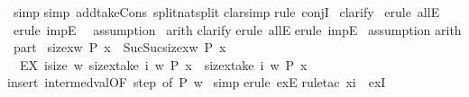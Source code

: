 \begin{isabellebody}
\ simp{\isacharparenright}\isanewline
{}simp\ add{\isacharcolon}take{\isacharunderscore}Cons\ split{\isacharcolon}nat{\isachardot}split{\isacharparenright}\isanewline
{}clarsimp{\isacharparenright}\isanewline
{}rule\ conjI{\isacharparenright}\isanewline
\ clarify{\isacharparenright}\isanewline
\ erule\ allE{\isacharparenright}\isanewline
\ erule\ impE{\isacharparenright}\isanewline
\ \ assumption{\isacharparenright}\isanewline
\ arith{\isacharparenright}\isanewline
{}clarify{\isacharparenright}\isanewline
{}erule\ allE{\isacharparenright}\isanewline
{}erule\ impE{\isacharparenright}\isanewline
\ assumption{\isacharparenright}\isanewline
{}arith{\isacharparenright}\isanewline
\isanewline
\isanewline
{}\ part{}{\isacharcolon}\isanewline
\ {\isachardoublequote}size{\isacharbrackleft}x{\isacharcolon}w{\isachardot}\ P\ x{\isacharbrackright}\ {\isacharequal}\ Suc{\isacharparenleft}Suc{\isacharparenleft}size{\isacharbrackleft}x{\isacharcolon}w{\isachardot}\ {\isachartilde}P\ x{\isacharbrackright}{\isacharparenright}{\isacharparenright}\ {\isacharequal}{\isacharequal}{\isachargreater}\isanewline
\ \ EX\ i{\isacharless}{\isacharequal}size\ w{\isachardot}\ size{\isacharbrackleft}x{\isacharcolon}take\ i\ w{\isachardot}\ P\ x{\isacharbrackright}\ {\isacharequal}\ size{\isacharbrackleft}x{\isacharcolon}take\ i\ w{\isachardot}\ {\isachartilde}P\ x{\isacharbrackright}{\isacharplus}{}{\isachardoublequote}\isanewline
{}insert\ intermed{\isacharunderscore}val{\isacharbrackleft}OF\ step{}{\isacharcomma}\ of\ {\isachardoublequote}P{\isachardoublequote}\ {\isachardoublequote}w{\isachardoublequote}\ {\isachardoublequote}{\isacharhash}{}{\isachardoublequote}{\isacharbrackright}{\isacharparenright}\isanewline
{}simp{\isacharparenright}\isanewline
{}erule\ exE{\isacharparenright}\isanewline
{}rule{\isacharunderscore}tac\ x{\isacharequal}i\ \ exI{\isacharparenright}\isanewline

\end{isabellebody}
